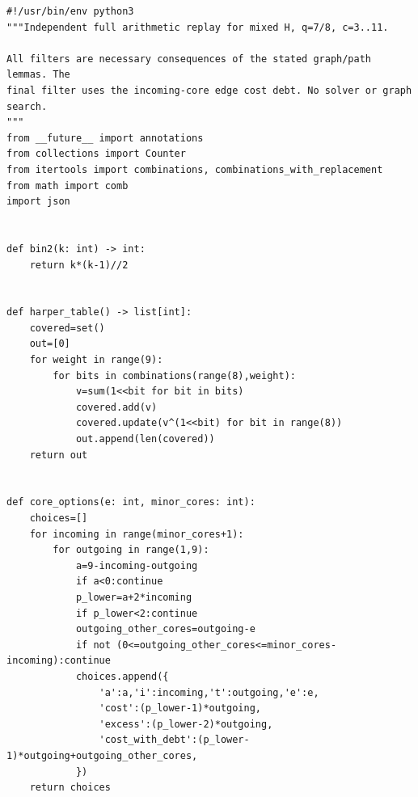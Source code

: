 \documentclass[11pt,a4paper]{article}
\begin{document}
\begin{Verbatim}[breaklines,breakanywhere,fontsize=\footnotesize]
#!/usr/bin/env python3
"""Independent full arithmetic replay for mixed H, q=7/8, c=3..11.

All filters are necessary consequences of the stated graph/path lemmas. The
final filter uses the incoming-core edge cost debt. No solver or graph search.
"""
from __future__ import annotations
from collections import Counter
from itertools import combinations, combinations_with_replacement
from math import comb
import json


def bin2(k: int) -> int:
    return k*(k-1)//2


def harper_table() -> list[int]:
    covered=set()
    out=[0]
    for weight in range(9):
        for bits in combinations(range(8),weight):
            v=sum(1<<bit for bit in bits)
            covered.add(v)
            covered.update(v^(1<<bit) for bit in range(8))
            out.append(len(covered))
    return out


def core_options(e: int, minor_cores: int):
    choices=[]
    for incoming in range(minor_cores+1):
        for outgoing in range(1,9):
            a=9-incoming-outgoing
            if a<0:continue
            p_lower=a+2*incoming
            if p_lower<2:continue
            outgoing_other_cores=outgoing-e
            if not (0<=outgoing_other_cores<=minor_cores-incoming):continue
            choices.append({
                'a':a,'i':incoming,'t':outgoing,'e':e,
                'cost':(p_lower-1)*outgoing,
                'excess':(p_lower-2)*outgoing,
                'cost_with_debt':(p_lower-1)*outgoing+outgoing_other_cores,
            })
    return choices



\end{Verbatim}
\end{document}
